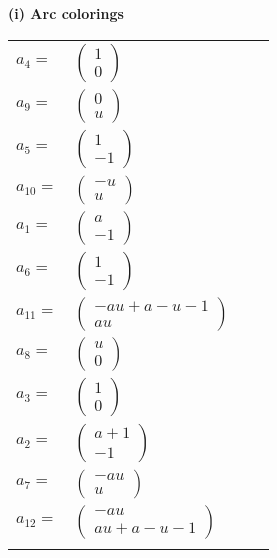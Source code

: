 \documentclass[1p]{elsarticle_modified}
\theoremstyle{definition}
\begin{document}
\flushleft \textbf{(i) Arc colorings}\\
\begin{tabular}{m{7pt} m{180pt} m{7pt} m{180pt} }
\flushright $a_{4}=$&$\begin{pmatrix}1\\0\end{pmatrix}$ \\
\flushright $a_{9}=$&$\begin{pmatrix}0\\u\end{pmatrix}$ \\
\flushright $a_{5}=$&$\begin{pmatrix}1\\-1\end{pmatrix}$ \\
\flushright $a_{10}=$&$\begin{pmatrix}- u\\u\end{pmatrix}$ \\
\flushright $a_{1}=$&$\begin{pmatrix}a\\-1\end{pmatrix}$ \\
\flushright $a_{6}=$&$\begin{pmatrix}1\\-1\end{pmatrix}$ \\
\flushright $a_{11}=$&$\begin{pmatrix}- a u+a- u-1\\a u\end{pmatrix}$ \\
\flushright $a_{8}=$&$\begin{pmatrix}u\\0\end{pmatrix}$ \\
\flushright $a_{3}=$&$\begin{pmatrix}1\\0\end{pmatrix}$ \\
\flushright $a_{2}=$&$\begin{pmatrix}a+1\\-1\end{pmatrix}$ \\
\flushright $a_{7}=$&$\begin{pmatrix}- a u\\u\end{pmatrix}$ \\
\flushright $a_{12}=$&$\begin{pmatrix}- a u\\a u+a- u-1\end{pmatrix}$\\&\end{tabular}
\end{document}

